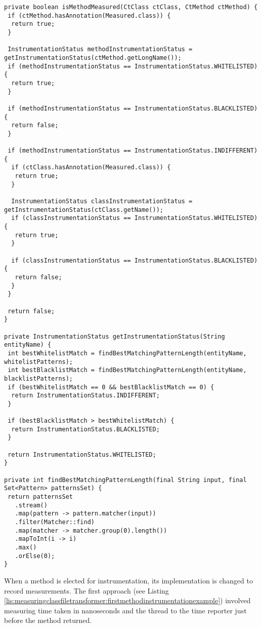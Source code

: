 \begin{lstlisting}[breaklines,caption={$MeasuringClassFileTransformer.isMethodMeasured$ implementation},label=lis:measuringclassfiletransformer:ismethodmeasured]
private boolean isMethodMeasured(CtClass ctClass, CtMethod ctMethod) {
 if (ctMethod.hasAnnotation(Measured.class)) {
  return true;
 }

 InstrumentationStatus methodInstrumentationStatus = getInstrumentationStatus(ctMethod.getLongName());
 if (methodInstrumentationStatus == InstrumentationStatus.WHITELISTED) {
  return true;
 }

 if (methodInstrumentationStatus == InstrumentationStatus.BLACKLISTED) {
  return false;
 }

 if (methodInstrumentationStatus == InstrumentationStatus.INDIFFERENT) {
  if (ctClass.hasAnnotation(Measured.class)) {
   return true;
  }

  InstrumentationStatus classInstrumentationStatus = getInstrumentationStatus(ctClass.getName());
  if (classInstrumentationStatus == InstrumentationStatus.WHITELISTED) {
   return true;
  }

  if (classInstrumentationStatus == InstrumentationStatus.BLACKLISTED) {
   return false;
  }
 }
    
 return false;
}

private InstrumentationStatus getInstrumentationStatus(String entityName) {
 int bestWhitelistMatch = findBestMatchingPatternLength(entityName, whitelistPatterns);
 int bestBlacklistMatch = findBestMatchingPatternLength(entityName, blacklistPatterns);
 if (bestWhitelistMatch == 0 && bestBlacklistMatch == 0) {
  return InstrumentationStatus.INDIFFERENT;
 }

 if (bestBlacklistMatch > bestWhitelistMatch) {
  return InstrumentationStatus.BLACKLISTED;
 }

 return InstrumentationStatus.WHITELISTED;
}

private int findBestMatchingPatternLength(final String input, final Set<Pattern> patternsSet) {
 return patternsSet
   .stream()
   .map(pattern -> pattern.matcher(input))
   .filter(Matcher::find)
   .map(matcher -> matcher.group(0).length())
   .mapToInt(i -> i)
   .max()
   .orElse(0);
}
\end{lstlisting}

\noindent When a method is elected for instrumentation, its implementation is changed to record measurements. The first approach (see Listing \ref{lis:measuringclassfiletransformer:firstmethodinstrumentationexample}) involved measuring time taken in nanoseconds and the thread  to the time reporter just before the method returned.

